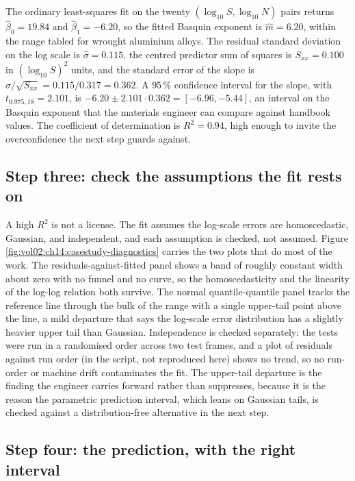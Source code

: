 The ordinary least-squares fit on the twenty $(\log_{10} S,
\log_{10} N)$ pairs returns $\hat{\beta}_{0} = 19.84$ and
$\hat{\beta}_{1} = -6.20$, so the fitted Basquin exponent is
$\hat{m} = 6.20$, within the range tabled for wrought aluminium
alloys. The residual standard deviation on the log scale is
$\hat{\sigma} = 0.115$, the centred predictor sum of squares is
$S_{xx} = 0.100$ in $(\log_{10} S)^{2}$ units, and the standard
error of the slope is $\hat{\sigma}/\sqrt{S_{xx}} = 0.115/0.317 =
0.362$. A $95\,\%$ confidence interval for the slope, with
$t_{0.975,18} = 2.101$, is $-6.20 \pm 2.101 \cdot 0.362 = [-6.96,
-5.44]$, an interval on the Basquin exponent that the materials
engineer can compare against handbook values. The coefficient of
determination is $R^{2} = 0.94$, high enough to invite the
overconfidence the next step guards against.

\subsection{Step three: check the assumptions the fit rests on}

A high $R^{2}$ is not a license. The fit assumes the log-scale
errors are homoscedastic, Gaussian, and independent, and each
assumption is checked, not assumed. Figure
\ref{fig:vol02:ch14:casestudy-diagnostics} carries the two plots
that do most of the work. The residuals-against-fitted panel shows a
band of roughly constant width about zero with no funnel and no
curve, so the homoscedasticity and the linearity of the log-log
relation both survive. The normal quantile-quantile panel tracks the
reference line through the bulk of the range with a single
upper-tail point above the line, a mild departure that says the
log-scale error distribution has a slightly heavier upper tail than
Gaussian. Independence is checked separately: the tests were run in a
randomised order across two test frames, and a plot of residuals
against run order (in the script, not reproduced here) shows no
trend, so no run-order or machine drift contaminates the fit. The
upper-tail departure is the finding the engineer carries forward
rather than suppresses, because it is the reason the parametric
prediction interval, which leans on Gaussian tails, is checked
against a distribution-free alternative in the next step.



\subsection{Step four: the prediction, with the right interval}

